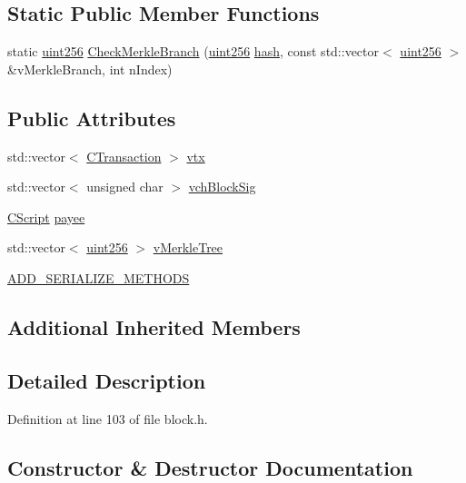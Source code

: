 \subsection*{Static Public Member Functions}
\begin{DoxyCompactItemize}
\item 
static \hyperlink{classuint256}{uint256} \hyperlink{class_c_block_ab0d596c51fb317e3cb6f444015a652a5}{Check\+Merkle\+Branch} (\hyperlink{classuint256}{uint256} \hyperlink{cache_8cc_a11ecb029164e055f28f4123ce3748862}{hash}, const std\+::vector$<$ \hyperlink{classuint256}{uint256} $>$ \&v\+Merkle\+Branch, int n\+Index)
\end{DoxyCompactItemize}
\subsection*{Public Attributes}
\begin{DoxyCompactItemize}
\item 
std\+::vector$<$ \hyperlink{class_c_transaction}{C\+Transaction} $>$ \hyperlink{class_c_block_a9b6508d662722775f3029b980b382b66}{vtx}
\item 
std\+::vector$<$ unsigned char $>$ \hyperlink{class_c_block_a78f882e24c4416f42039cbc6a67faf6e}{vch\+Block\+Sig}
\item 
\hyperlink{class_c_script}{C\+Script} \hyperlink{class_c_block_a1604a6d25f313ab1bf4e3777a6cba948}{payee}
\item 
std\+::vector$<$ \hyperlink{classuint256}{uint256} $>$ \hyperlink{class_c_block_a019ae6579acd08974653d3f443dd398a}{v\+Merkle\+Tree}
\item 
\hyperlink{class_c_block_a53ba28b86cf6c5b1de640941786fa3b8}{A\+D\+D\+\_\+\+S\+E\+R\+I\+A\+L\+I\+Z\+E\+\_\+\+M\+E\+T\+H\+O\+D\+S}
\end{DoxyCompactItemize}
\subsection*{Additional Inherited Members}


\subsection{Detailed Description}


Definition at line 103 of file block.\+h.



\subsection{Constructor \& Destructor Documentation}
\hypertarget{class_c_block_aaaf8819d785559699cffbbfccb37a3b6}{}
